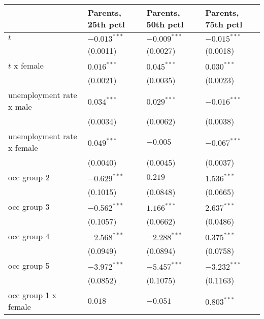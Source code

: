 \begin{tabular}{llll}
\toprule
{} & Parents, 25th pctl & Parents, 50th pctl & Parents, 75th pctl \\
\midrule
$t$                                    &     $-0.013^{***}$ &     $-0.009^{***}$ &     $-0.015^{***}$ \\
                                       &           (0.0011) &           (0.0027) &           (0.0018) \\
$t$ x female                           &      $0.016^{***}$ &      $0.045^{***}$ &      $0.030^{***}$ \\
                                       &           (0.0021) &           (0.0035) &           (0.0023) \\
unemployment rate x male               &      $0.034^{***}$ &      $0.029^{***}$ &     $-0.016^{***}$ \\
                                       &           (0.0034) &           (0.0062) &           (0.0038) \\
unemployment rate x female             &      $0.049^{***}$ &           $-0.005$ &     $-0.067^{***}$ \\
                                       &           (0.0040) &           (0.0045) &           (0.0037) \\
occ group 2                            &     $-0.629^{***}$ &            $0.219$ &      $1.536^{***}$ \\
                                       &           (0.1015) &           (0.0848) &           (0.0665) \\
occ group 3                            &     $-0.562^{***}$ &      $1.166^{***}$ &      $2.637^{***}$ \\
                                       &           (0.1057) &           (0.0662) &           (0.0486) \\
occ group 4                            &     $-2.568^{***}$ &     $-2.288^{***}$ &      $0.375^{***}$ \\
                                       &           (0.0949) &           (0.0894) &           (0.0758) \\
occ group 5                            &     $-3.972^{***}$ &     $-5.457^{***}$ &     $-3.232^{***}$ \\
                                       &           (0.0852) &           (0.1075) &           (0.1163) \\
occ group 1 x female                   &            $0.018$ &           $-0.051$ &      $0.803^{***}$ \\

\end{tabular}
